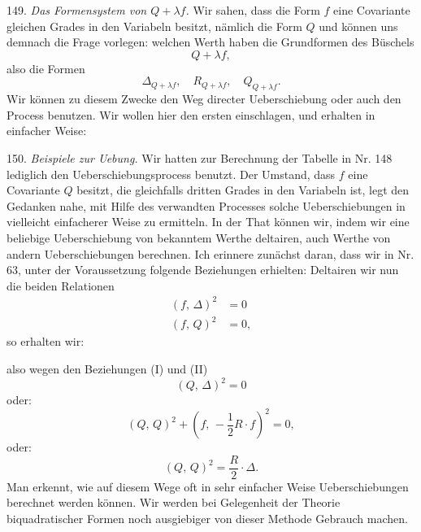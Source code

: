 149. \textit{Das Formensystem von $Q + \lambda f$.} Wir sahen, dass die Form $f$ eine Covariante gleichen Grades in den Variabeln besitzt, nämlich die Form $Q$ und können uns demnach die Frage vorlegen: welchen Werth haben die Grundformen des Büschels
\[
Q + \lambda f,
\]
also die Formen
\[
\Delta_{Q+\lambda f}, \quad R_{Q+\lambda f}, \quad Q_{Q+\lambda f}.
\]
Wir können zu diesem Zwecke den Weg directer Ueberschiebung oder auch den  Process benutzen. Wir wollen hier den ersten einschlagen, und erhalten in einfacher Weise:

150. \textit{Beispiele zur Uebung.} Wir hatten zur Berechnung der Tabelle in Nr. 148 lediglich den Ueberschiebungsprocess benutzt. Der Umstand, dass $f$ eine Covariante $Q$ besitzt, die gleichfalls dritten Grades in den Variabeln ist, legt den Gedanken nahe, mit Hilfe des verwandten  Processes solche Ueberschiebungen in vielleicht einfacherer Weise zu ermitteln. In der That können wir, indem wir eine beliebige Ueberschiebung von bekanntem Werthe deltairen, auch Werthe von andern Ueberschiebungen berechnen. Ich erinnere zunächst daran, dass wir in Nr. 63, unter der Voraussetzung
folgende Beziehungen erhielten:
Deltairen wir nun die beiden Relationen
\[
\begin{aligned}
(f,\,\Delta)^2 &= 0\\
(f,\,Q)^2 &= 0,
\end{aligned}
\]
so erhalten wir:


also wegen den Beziehungen (I) und (II)
\[
(Q,\,\Delta)^2 = 0
\]
oder:
\[
(Q,\,Q)^2 + \left(f,\,-\frac{1}{2}R\cdot f\right)^2 = 0,
\]
oder:
\[
(Q,\,Q)^2 = \frac{R}{2}\cdot\Delta.
\]
Man erkennt, wie auf diesem Wege oft in sehr einfacher Weise Ueberschiebungen berechnet werden können. Wir werden bei Gelegenheit der Theorie biquadratischer Formen noch ausgiebiger von dieser Methode Gebrauch machen.

